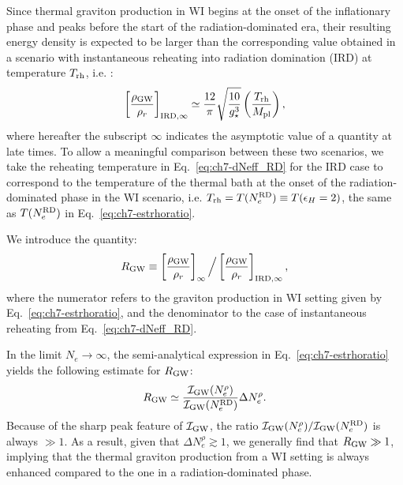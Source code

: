 Since thermal graviton production in WI begins at the onset of the inflationary phase and peaks before the start of the radiation-dominated era, their resulting energy density is expected to be larger than the corresponding value obtained in a scenario with instantaneous reheating into radiation domination  (IRD) at temperature $T_{\rm rh}$, i.e. :
\begin{equation}
   \left[\frac{\rho_{\rm GW}}{\rho_r}\right]_{\rm{IRD},\infty} \simeq \frac{12}{\pi}\sqrt{\frac{10}{g_\star^3}}\left(\frac{T_{\rm rh}}{M_{\rm pl}}\right),\label{eq:ch7-dNeff_RD}
\end{equation}
where hereafter the subscript $\infty$ indicates the asymptotic value of a quantity at late times.
To allow a meaningful comparison between these two scenarios,
 we take the reheating temperature in Eq.~\eqref{eq:ch7-dNeff_RD} for the IRD case to correspond to the
temperature of the thermal bath at the onset of the radiation-dominated phase in the WI scenario, i.e. $T_{\rm rh} = T(N_e^{\rm RD})\equiv T(\epsilon_H = 2)$,  the same as $T(N_e^{\rm RD})$ in  Eq.~\eqref{eq:ch7-estrhoratio}.

We introduce the quantity:
\begin{equation}
    R_{\rm GW}\equiv \left[\frac{\rho_{\rm GW}}{\rho_r}\right]_\infty\Big/\left[\frac{\rho_{\rm GW}}{\rho_r}\right]_{\rm IRD,\infty},\label{eq:ch7-enhancement_ratio}
\end{equation}
where the numerator refers to the graviton production in WI setting given by Eq.~\eqref{eq:ch7-estrhoratio}, and the denominator to the case of instantaneous reheating from Eq.~\eqref{eq:ch7-dNeff_RD}.

In the limit $N_e \rightarrow \infty$, the semi-analytical expression in Eq.~\eqref{eq:ch7-estrhoratio} yields the following estimate for $R_{\rm GW}$:
\begin{eqnarray}
    R_{\rm GW}\simeq \frac{\mathcal{I}_{\rm GW} (N_e^{\rho})}{\mathcal{I}_{\rm GW} (N_e^{\rm{RD}})}\Delta N_e^{\rho}. \label{eq:ch7-boost_SA}
\end{eqnarray}
Because of the sharp peak feature of $\mathcal{I}_{\rm GW}$, the ratio $\mathcal{I}_{\rm GW} (N_e^{\rho})/\mathcal{I}_{\rm GW} (N_e^{\rm{RD}})$  is  always $\gg1$. As a result, given that $\Delta N_e^{\rho}\gtrsim 1$, we generally find that  $R_{\rm GW}\gg 1$, implying that the thermal graviton production from a WI setting is always enhanced compared to the one in a radiation-dominated phase.

